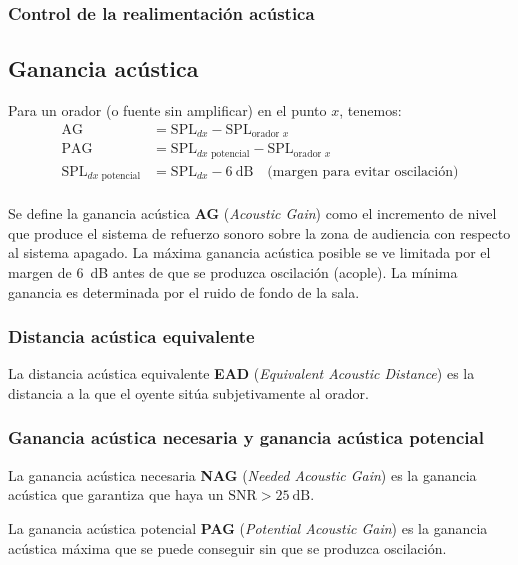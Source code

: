 \documentclass[a4paper, 8pt]{extarticle}
\begin{document}
\begin{multicols}{3}
  \subsubsection{Control de la realimentación acústica}

  \subsection{Ganancia acústica}

  Para un orador (o fuente sin amplificar) en el punto $x$, tenemos:
  \begin{align*}
    \text{AG}                         & = \text{SPL}_{dx} - \text{SPL}_{\text{orador }x}                              \\
    \text{PAG}                        & = \text{SPL}_{dx \text{ potencial}} - \text{SPL}_{\text{orador }x}            \\
    \text{SPL}_{dx \text{ potencial}} & = \text{SPL}_{dx} - \qty{6}{\dB} \quad \text{(margen para evitar oscilación)} \\
  \end{align*}

  Se define la ganancia acústica \textbf{AG} (\textit{Acoustic Gain}) como el incremento de nivel que produce el sistema de refuerzo sonoro sobre la zona de audiencia con respecto al sistema apagado. La máxima ganancia acústica posible se ve limitada por el margen de \qty{6}{\dB} antes de que se produzca oscilación (acople). La mínima ganancia es determinada por el ruido de fondo de la sala.
  \subsubsection{Distancia acústica equivalente}
  La distancia acústica equivalente \textbf{EAD} (\textit{Equivalent Acoustic Distance}) es la distancia a la que el oyente sitúa subjetivamente al orador.
  \subsubsection{Ganancia acústica necesaria y ganancia acústica potencial}

  La ganancia acústica necesaria \textbf{NAG} (\textit{Needed Acoustic Gain}) es la ganancia acústica que garantiza que haya un $\text{SNR} > \qty{25}{\dB} $.

  La ganancia acústica potencial \textbf{PAG} (\textit{Potential Acoustic Gain}) es la ganancia acústica máxima que se puede conseguir sin que se produzca oscilación.


\end{multicols}
\end{document}
